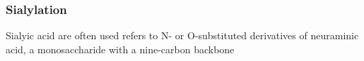 \subsubsection {Sialylation}
Sialyic acid are often used refers to N- or O-substituted derivatives of neuraminic acid, a monosaccharide with a nine-carbon backbone